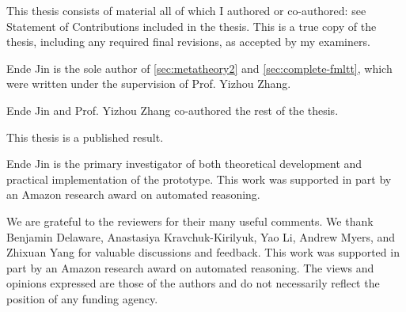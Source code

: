 





\newpage

\setcounter{page}{1}

\vspace*{\fill}


This thesis consists of material all of which I authored or co-authored: see Statement of Contributions included in the thesis. This is a true copy of the thesis, including any required final revisions, as accepted by my examiners.

\vspace*{\fill}

\newpage 


\vspace*{\fill}




Ende Jin is the sole author of \cref{sec:metatheory2} and \cref{sec:complete-fmltt}, which were written under the supervision of Prof. Yizhou Zhang.

Ende Jin and Prof. Yizhou Zhang co-authored the rest of the thesis.

This thesis is a published result.

 Ende Jin is the primary investigator of both theoretical development and practical implementation of the prototype. This work was supported in part by an Amazon research award on automated
reasoning.

\vspace*{\fill}

\newpage


\vspace*{\fill}


\vspace*{\fill}


\newpage


\vspace*{\fill}

We are grateful to the reviewers for their many useful comments.  We thank
Benjamin Delaware,
Anastasiya Kravchuk-Kirilyuk, Yao Li, Andrew Myers, and Zhixuan Yang
for valuable discussions and feedback.
This work was supported in part by an Amazon research award on automated
reasoning.
The views and opinions expressed are those of the authors and do not necessarily
reflect the position of any funding agency.

